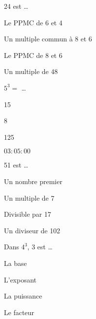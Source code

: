 \begin{QCM}
\begin{GroupeQCM}
    \begin{exercice}
      24 est \ldots
      \begin{ChoixQCM}{4}
      \item Le PPMC de 6 et 4
      \item Un multiple commun à 8 et 6 
      \item Le PPMC de 8 et 6
      \item Un multiple de 48
      \end{ChoixQCM}
\begin{corrige}
   \end{corrige}
    \end{exercice}
    
    \begin{exercice}
      $5^3 =$ \ldots
      \begin{ChoixQCM}{4}
      \item 15
      \item 8
      \item 125
      \item $03:05:00$
      \end{ChoixQCM}
\begin{corrige}
   \end{corrige}
    \end{exercice}
    
    \begin{exercice}
      51 est \ldots
      \begin{ChoixQCM}{4}
      \item Un nombre premier
      \item Un multiple de 7
      \item Divisible par 17
      \item Un diviseur de 102
      \end{ChoixQCM}
\begin{corrige}
   \end{corrige}
    \end{exercice}
    
    \begin{exercice}
      Dans $4^3$, 3 est \ldots
      \begin{ChoixQCM}{4}
      \item La base
      \item L'exposant
      \item La puissance
      \item Le facteur
      \end{ChoixQCM}
\begin{corrige}
   \end{corrige}
    \end{exercice}
    

\end{GroupeQCM}
\end{QCM}
